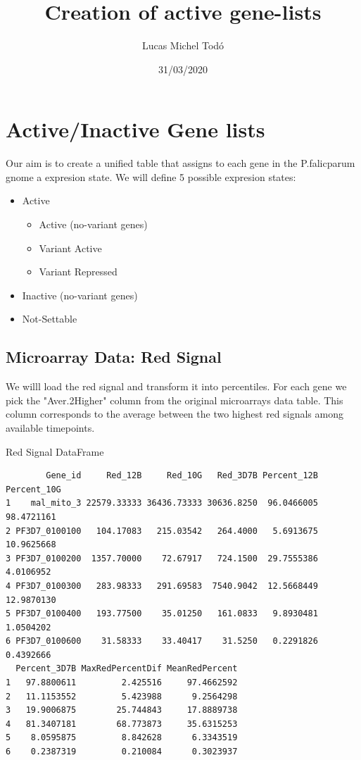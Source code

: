 \documentclass[11pt]{article}
\author{Lucas Michel Todó}
\date{31/03/2020}
\title{Creation of active gene-lists}
\begin{document}
\maketitle
\tableofcontents \clearpage
\section{Active/Inactive Gene lists}
\label{sec:org8b7b1a7}
Our aim is to create a unified table that assigns to each gene in the P.falicparum gnome a expresion state.
We will define 5 possible expresion states:
\begin{itemize}
\item Active
\begin{itemize}
\item Active (no-variant genes)
\item Variant Active
\item Variant Repressed
\end{itemize}
\item Inactive (no-variant genes)
\item Not-Settable
\end{itemize}

\subsection{Microarray Data: Red Signal}
\label{sec:org0bb25cd}
We willl load the red signal and transform it into percentiles. For each gene we pick the "Aver.2Higher" column from the original microarrays data table. This column corresponds to the average between the two highest red signals among available timepoints.

Red Signal DataFrame
\begin{verbatim}
        Gene_id     Red_12B     Red_10G   Red_3D7B Percent_12B Percent_10G
1    mal_mito_3 22579.33333 36436.73333 30636.8250  96.0466005  98.4721161
2 PF3D7_0100100   104.17083   215.03542   264.4000   5.6913675  10.9625668
3 PF3D7_0100200  1357.70000    72.67917   724.1500  29.7555386   4.0106952
4 PF3D7_0100300   283.98333   291.69583  7540.9042  12.5668449  12.9870130
5 PF3D7_0100400   193.77500    35.01250   161.0833   9.8930481   1.0504202
6 PF3D7_0100600    31.58333    33.40417    31.5250   0.2291826   0.4392666
  Percent_3D7B MaxRedPercentDif MeanRedPercent
1   97.8800611         2.425516     97.4662592
2   11.1153552         5.423988      9.2564298
3   19.9006875        25.744843     17.8889738
4   81.3407181        68.773873     35.6315253
5    8.0595875         8.842628      6.3343519
6    0.2387319         0.210084      0.3023937
\end{verbatim}
\end{document}
